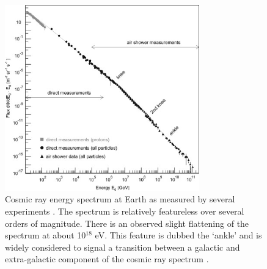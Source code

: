\documentclass{gatech-thesis}
\begin{document}
\begin{figure}[ht]
  \begin{center}
    \includegraphics[width=0.75\textwidth,keepaspectratio]{CosmicRaySpectrum.jpg}
  \end{center}
  \caption[Cosmic Ray Spectrum]{Cosmic ray energy spectrum at Earth as measured by several experiments \cite{2009PrPNP..63..293B}. The spectrum is relatively featureless over several orders of magnitude. There is an observed slight flattening of the spectrum at about 10$^{18}$ eV. This feature is dubbed the `ankle' and is widely considered to signal a transition between a galactic and extra-galactic component of the cosmic ray spectrum \cite{2012APh....39..129A}.}
  \label{fig:cosmicray_spec}
\end{figure}
\end{document}
